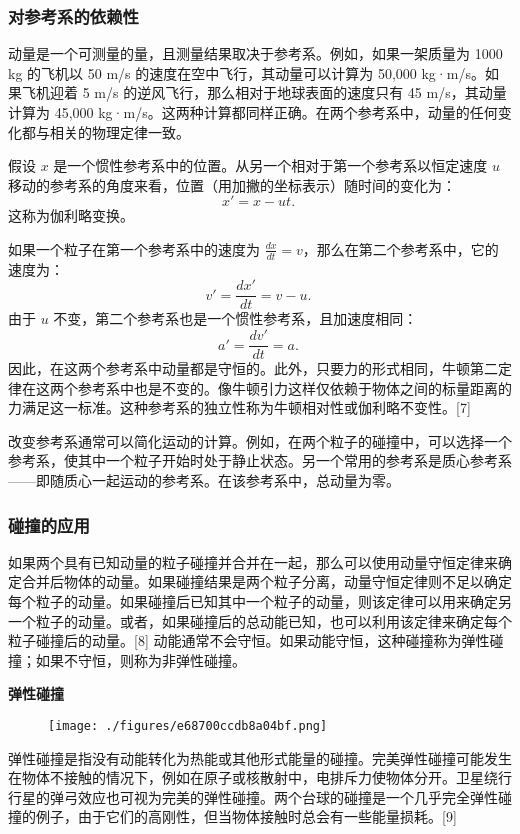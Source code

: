 \subsubsection{对参考系的依赖性}
动量是一个可测量的量，且测量结果取决于参考系。例如，如果一架质量为 1000 kg 的飞机以 50 m/s 的速度在空中飞行，其动量可以计算为 50,000 kg·m/s。如果飞机迎着 5 m/s 的逆风飞行，那么相对于地球表面的速度只有 45 m/s，其动量计算为 45,000 kg·m/s。这两种计算都同样正确。在两个参考系中，动量的任何变化都与相关的物理定律一致。

假设 \( x \) 是一个惯性参考系中的位置。从另一个相对于第一个参考系以恒定速度 \( u \) 移动的参考系的角度来看，位置（用加撇的坐标表示）随时间的变化为：
\[
x' = x - ut.~
\]
这称为伽利略变换。

如果一个粒子在第一个参考系中的速度为 \( \frac{dx}{dt} = v \)，那么在第二个参考系中，它的速度为：
\[
v' = \frac{dx'}{dt} = v - u.~
\]
由于 \( u \) 不变，第二个参考系也是一个惯性参考系，且加速度相同：
\[
a' = \frac{dv'}{dt} = a.~
\]
因此，在这两个参考系中动量都是守恒的。此外，只要力的形式相同，牛顿第二定律在这两个参考系中也是不变的。像牛顿引力这样仅依赖于物体之间的标量距离的力满足这一标准。这种参考系的独立性称为牛顿相对性或伽利略不变性。[7]

改变参考系通常可以简化运动的计算。例如，在两个粒子的碰撞中，可以选择一个参考系，使其中一个粒子开始时处于静止状态。另一个常用的参考系是质心参考系——即随质心一起运动的参考系。在该参考系中，总动量为零。
\subsubsection{碰撞的应用}
如果两个具有已知动量的粒子碰撞并合并在一起，那么可以使用动量守恒定律来确定合并后物体的动量。如果碰撞结果是两个粒子分离，动量守恒定律则不足以确定每个粒子的动量。如果碰撞后已知其中一个粒子的动量，则该定律可以用来确定另一个粒子的动量。或者，如果碰撞后的总动能已知，也可以利用该定律来确定每个粒子碰撞后的动量。[8] 动能通常不会守恒。如果动能守恒，这种碰撞称为弹性碰撞；如果不守恒，则称为非弹性碰撞。

\textbf{弹性碰撞}\\
\begin{figure}[ht]
\centering
\texttt{[image: ./figures/e68700ccdb8a04bf.png]}
\caption{} \label{fig_DL_2}
\end{figure}
弹性碰撞是指没有动能转化为热能或其他形式能量的碰撞。完美弹性碰撞可能发生在物体不接触的情况下，例如在原子或核散射中，电排斥力使物体分开。卫星绕行行星的弹弓效应也可视为完美的弹性碰撞。两个台球的碰撞是一个几乎完全弹性碰撞的例子，由于它们的高刚性，但当物体接触时总会有一些能量损耗。[9]

